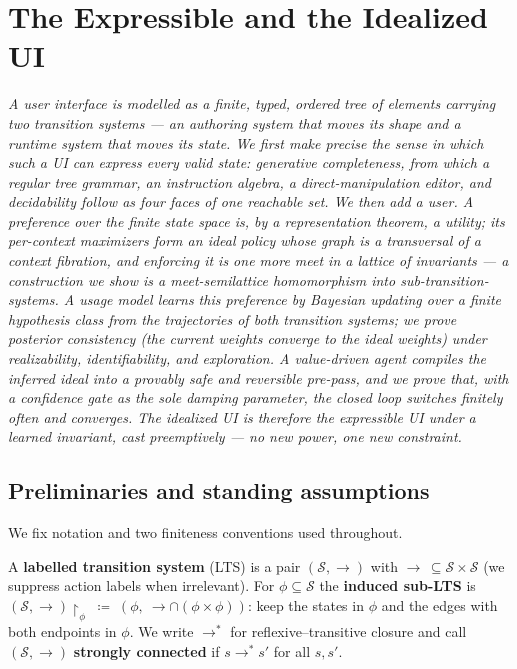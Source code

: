 \documentclass[../uxoxo-main]{subfiles}
\begin{document}
\chapter{The Expressible and the Idealized UI}


\begingroup\itshape\small
\noindent
A user interface is modelled as a finite, typed, ordered tree of elements
carrying two transition systems --- an \emph{authoring} system that moves its
shape and a \emph{runtime} system that moves its state. We first make precise the
sense in which such a UI can express every valid state: \emph{generative
completeness}, from which a regular tree grammar, an instruction algebra, a
direct-manipulation editor, and decidability follow as four faces of one
reachable set. We then add a user. A \emph{preference} over the finite state
space is, by a representation theorem, a utility; its per-context maximizers form
an \emph{ideal policy} whose graph is a transversal of a context fibration, and
enforcing it is one more meet in a lattice of invariants --- a construction we
show is a meet-semilattice homomorphism into sub-transition-systems. A
\emph{usage model} learns this preference by Bayesian updating over a finite
hypothesis class from the trajectories of both transition systems; we prove
posterior consistency (the current weights converge to the ideal weights) under
realizability, identifiability, and exploration. A \emph{value-driven agent}
compiles the inferred ideal into a provably safe and reversible pre-pass, and we
prove that, with a confidence gate as the sole damping parameter, the closed loop
switches finitely often and converges. The idealized UI is therefore the
expressible UI under a learned invariant, cast preemptively --- no new power, one
new constraint.
\par\endgroup\medskip


\section{Preliminaries and standing assumptions}\label{iu:prelim}
We fix notation and two finiteness conventions used throughout.

A \textbf{labelled transition system} (LTS) is a pair $(\mathcal S,\to)$ with
$\to\,\subseteq\mathcal S\times\mathcal S$ (we suppress action labels when
irrelevant). For $\phi\subseteq\mathcal S$ the \textbf{induced sub-LTS} is
$(\mathcal S,\to)\!\restriction_\phi\;\coloneqq\;(\phi,\ \to\cap(\phi\times\phi))$:
keep the states in $\phi$ and the edges with both endpoints in $\phi$. We write
$\to^{*}$ for reflexive--transitive closure and call $(\mathcal S,\to)$
\textbf{strongly connected} if $s\to^{*}s'$ for all $s,s'$.
\end{document}
